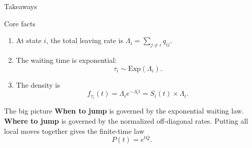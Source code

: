 \documentclass[aspectratio=169,professionalfonts]{beamer}
\begin{document}
\begin{frame}{Takeaways}
\small
\begin{block}{Core facts}
\begin{enumerate}
  \item At state $i$, the total leaving rate is $\Lambda_i=\sum_{j\neq i}q_{ij}$.
  \item The waiting time is exponential:
  \[
  \tau_i\sim \mathrm{Exp}(\Lambda_i).
  \]
  \item The density is
  \[
  f_{\tau_i}(t)=\Lambda_i e^{-\Lambda_i t}=S_i(t)\times \Lambda_i.
  \]
\end{enumerate}
\end{block}

\begin{alertblock}{The big picture}
\textbf{When to jump} is governed by the exponential waiting law. \textbf{Where to jump} is governed by the normalized off-diagonal rates. Putting all local moves together gives the finite-time law
\[
P(t)=e^{tQ}.
\]
\end{alertblock}
\end{frame}
\end{document}
